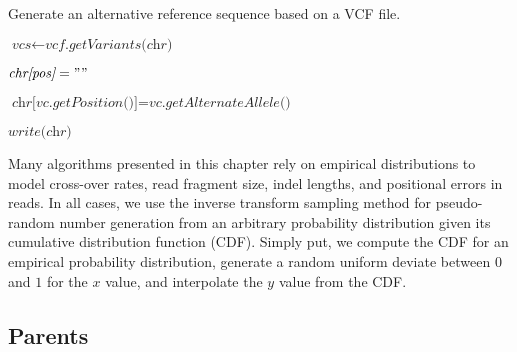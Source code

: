 \begin{algorithm}
\caption{Generate an alternative reference sequence based on a VCF file.}
\label{alg:IncorporateVariantsIntoGenome}
\begin{algorithmic}[1]
        \State $\textit{vcs} \gets \textit{vcf.getVariants(chr)}$

                    \State $\textit{chr[pos]} = ""$
                \EndFor
            \EndIf

            \State $\textit{chr[vc.getPosition()]} = \textit{vc.getAlternateAllele()}$
        \EndFor

        \State $\textit{write(chr)}$
    \EndFor
\EndFunction
\end{algorithmic}
\end{algorithm}

Many algorithms presented in this chapter rely on empirical distributions to model cross-over rates, read fragment size, indel lengths, and positional errors in reads.  In all cases, we use the inverse transform sampling method for pseudo-random number generation from an arbitrary probability distribution given its cumulative distribution function (CDF)\cite{Devroye:2013gi}.  Simply put, we compute the CDF for an empirical probability distribution, generate a random uniform deviate between $0$ and $1$ for the $x$ value, and interpolate the $y$ value from the CDF.

\subsection{Parents}

